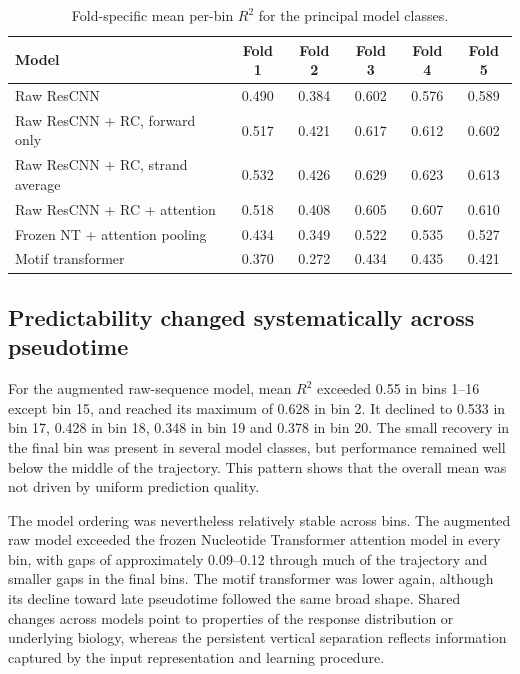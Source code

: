 \documentclass[a4paper,12pt]{article}
\begin{document}
\begin{table}[htb]
\centering
\caption{Fold-specific mean per-bin $R^2$ for the principal model classes.}
\label{tab:folds}
\begin{tabular}{lccccc}
\toprule
Model & Fold 1 & Fold 2 & Fold 3 & Fold 4 & Fold 5 \\
\midrule
Raw ResCNN & 0.490 & 0.384 & 0.602 & 0.576 & 0.589 \\
Raw ResCNN + RC, forward only & 0.517 & 0.421 & 0.617 & 0.612 & 0.602 \\
Raw ResCNN + RC, strand average & 0.532 & 0.426 & 0.629 & 0.623 & 0.613 \\
Raw ResCNN + RC + attention & 0.518 & 0.408 & 0.605 & 0.607 & 0.610 \\
Frozen NT + attention pooling & 0.434 & 0.349 & 0.522 & 0.535 & 0.527 \\
Motif transformer & 0.370 & 0.272 & 0.434 & 0.435 & 0.421 \\
\bottomrule
\end{tabular}
\end{table}

\subsection{Predictability changed systematically across pseudotime}

For the augmented raw-sequence model, mean $R^2$ exceeded 0.55 in bins 1--16 except bin 15, and reached its maximum of 0.628 in bin 2. It declined to 0.533 in bin 17, 0.428 in bin 18, 0.348 in bin 19 and 0.378 in bin 20. The small recovery in the final bin was present in several model classes, but performance remained well below the middle of the trajectory. This pattern shows that the overall mean was not driven by uniform prediction quality.

The model ordering was nevertheless relatively stable across bins. The augmented raw model exceeded the frozen Nucleotide Transformer attention model in every bin, with gaps of approximately 0.09--0.12 through much of the trajectory and smaller gaps in the final bins. The motif transformer was lower again, although its decline toward late pseudotime followed the same broad shape. Shared changes across models point to properties of the response distribution or underlying biology, whereas the persistent vertical separation reflects information captured by the input representation and learning procedure.
\end{document}
